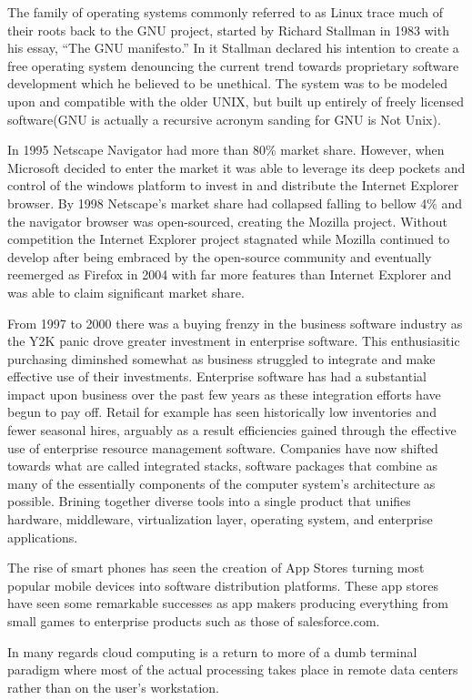 The family of operating systems commonly referred to as Linux trace much of their roots back to the GNU project, started by Richard Stallman in 1983 with his essay, ``The GNU manifesto.''\autocite[]{GNUManifesto}
In it Stallman declared his intention to create a free operating system denouncing the current trend towards proprietary software development which he believed to be unethical.\autocite[]{GNUManifesto}
The system was to be modeled upon and compatible with the older UNIX, but built up entirely of freely licensed software(GNU is actually a recursive acronym sanding for GNU is Not Unix).\autocite[]{GNUManifesto}

In 1995 Netscape Navigator had more than 80\% market share. However, when Microsoft decided to enter the market it was able to leverage its deep pockets and control of the windows platform to invest in and distribute the Internet Explorer browser.\autocite[27]{buxmann2012software}
By 1998 Netscape's market share had collapsed falling to bellow 4\% and the navigator browser was open-sourced, creating the Mozilla project.\autocite[27]{buxmann2012software}
Without competition the Internet Explorer project stagnated while Mozilla continued to develop after being embraced by the open-source community and eventually reemerged as Firefox in 2004 with far more features than Internet Explorer and was able to claim significant market share.\autocite[27]{buxmann2012software}

From 1997 to 2000 there was a buying frenzy in the business software industry as the Y2K panic drove greater investment in enterprise software.\autocite[]{AftermathOfIntegratedStack}
This enthusiasitic purchasing diminshed somewhat as business struggled to integrate and make effective use of their investments.\autocite[]{AftermathOfIntegratedStack}
Enterprise software has had a substantial impact upon business over the past few years as these integration efforts have begun to pay off. Retail for example has seen historically low inventories and fewer seasonal hires, arguably as a result efficiencies gained through the effective use of enterprise resource management software. \autocite[]{AftermathOfIntegratedStack}
Companies have now shifted towards what are called integrated stacks, software packages that combine as many of the essentially components of the computer system's architecture as possible.
Brining together diverse tools into a single product that unifies hardware, middleware, virtualization layer, operating system, and enterprise applications.\autocite[]{AftermathOfIntegratedStack}

The rise of smart phones has seen the creation of App Stores turning most popular mobile devices into software distribution platforms.\autocite[]{TheAppEconomy}
These app stores have seen some remarkable successes as app makers producing everything from small games to enterprise products such as those of salesforce.com.\autocite[45]{TheAppEconomy}

In many regards cloud computing is a return to more of a dumb terminal paradigm where most of the actual processing takes place in remote data centers rather than on the user's workstation.\autocite[]{LargeParadigmShiftCloudComputing}
